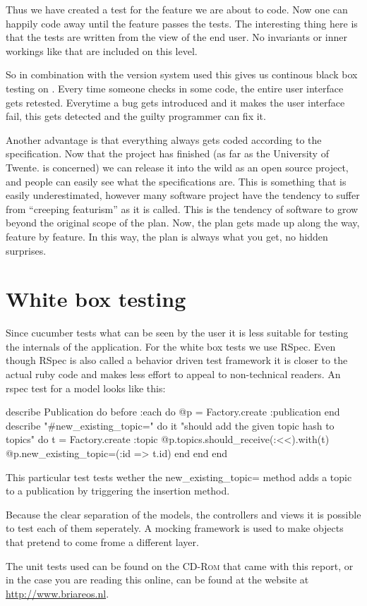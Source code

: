 Thus we have created a test for the feature we are about to code. Now one can happily code away until the feature passes the tests. The interesting thing here is that the tests are written from the view of the end user. No invariants or inner workings like that are included on this level.

So in combination with the version system used this gives us continous black box testing on \briareos{}. Every time someone checks in some code, the entire user interface gets retested. Everytime a bug gets introduced and it makes the user interface fail, this gets detected and the guilty programmer can fix it.

Another advantage is that everything always gets coded according to the specification. Now that the \briareos{} project has finished (as far as the University of Twente. is concerned) we can release it into the wild as an open source project, and people can easily see what the specifications are. This is something that is easily underestimated, however many software project have the tendency to suffer from ``creeping featurism'' as it is called. This is the tendency of software to grow beyond the original scope of the plan. Now, the plan gets made up along the way, feature by feature. In this way, the plan is always what you get, no hidden surprises.

\section{White box testing}

Since cucumber tests what can be seen by the user it is less suitable for testing the internals of the application. For the white box tests we use RSpec. Even though RSpec is also called a behavior driven test framework it is closer to the actual ruby code and makes less effort to appeal to non-technical readers. An rspec test for a model looks like this:

\begin{listing}[5]{1}
describe Publication do
  before :each do
    @p = Factory.create :publication
  end
  describe "#new_existing_topic=" do
    it "should add the given topic hash to topics" do
      t = Factory.create :topic
      @p.topics.should_receive(:<<).with(t)
      @p.new_existing_topic=({:id => t.id})
    end
  end
end
\end{listing}

This particular test tests wether the new\_existing\_topic= method adds a topic to a publication by triggering the insertion method.

Because the clear separation of the models, the controllers and views it is possible to test each of them seperately. A mocking framework is used to make objects that pretend to come frome a different layer.

The unit tests used can be found on the \textsc{CD-Rom} that came with this report, or in the case you are reading this online, can be found at the \briareos{} website at \url{http://www.briareos.nl}.
